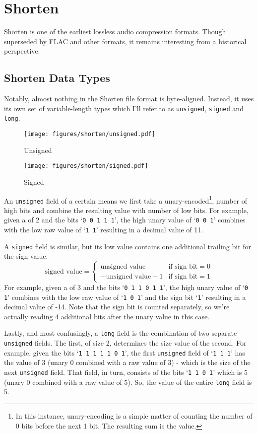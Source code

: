 \chapter{Shorten}
Shorten is one of the earliest lossless audio compression formats.
Though superseded by FLAC and other formats, it remains interesting
from a historical perspective.

\section{Shorten Data Types}
Notably, almost nothing in the Shorten file format is byte-aligned.
Instead, it uses its own set of variable-length types which I'll
refer to as \texttt{unsigned}, \texttt{signed} and \texttt{long}.

\begin{wrapfigure}[16]{r}{2in}
\texttt{[image: figures/shorten/unsigned.pdf]}
\caption{Unsigned}
\texttt{[image: figures/shorten/signed.pdf]}
\caption{Signed}
\end{wrapfigure}
An \texttt{unsigned} field of a certain  means we first
take a unary-encoded\footnote{In this instance, unary-encoding is a simple
matter of counting the number of 0 bits before the next 1 bit.
The resulting sum is the value.}, number of high bits and combine
the resulting value with  number of low bits.
For example, given a  of 2 and the bits `\texttt{0 0 1 1 1}',
the high unary value of `\texttt{0 0 1}' combines with the low
raw value of `\texttt{1 1}' resulting in a decimal value of 11.

A \texttt{signed} field is similar, but its low value contains
one additional trailing bit for the sign value.
{
\begin{equation*}
\text{signed value} =
\begin{cases}
\text{unsigned value} & \text{if sign bit} = 0 \\
-\text{unsigned value} - 1 & \text{if sign bit} = 1
\end{cases}
\end{equation*}
}
For example, given a  of 3 and the bits `\texttt{0 1 1 0 1 1}',
the high unary value of `\texttt{0 1}' combines with the low
raw value of `\texttt{1 0 1}' and the sign bit `\texttt{1}'
resulting in a decimal value of -14.
Note that the sign bit is counted separately, so we're
actually reading 4 additional bits after the unary value in this case.

Lastly, and most confusingly, a \texttt{long} field is the combination
of two separate \texttt{unsigned} fields.
The first, of size 2, determines the size value of the second.
For example, given the bits `\texttt{1 1 1 1 1 0 1}',
the first \texttt{unsigned} field of `\texttt{1 1 1}' has the value
of 3 (unary 0 combined with a raw value of 3) - which is the size
of the next \texttt{unsigned} field.
That field, in turn, consists of the bits `\texttt{1 1 0 1}'
which is 5 (unary 0 combined with a raw value of 5).
So, the value of the entire \texttt{long} field is 5.

